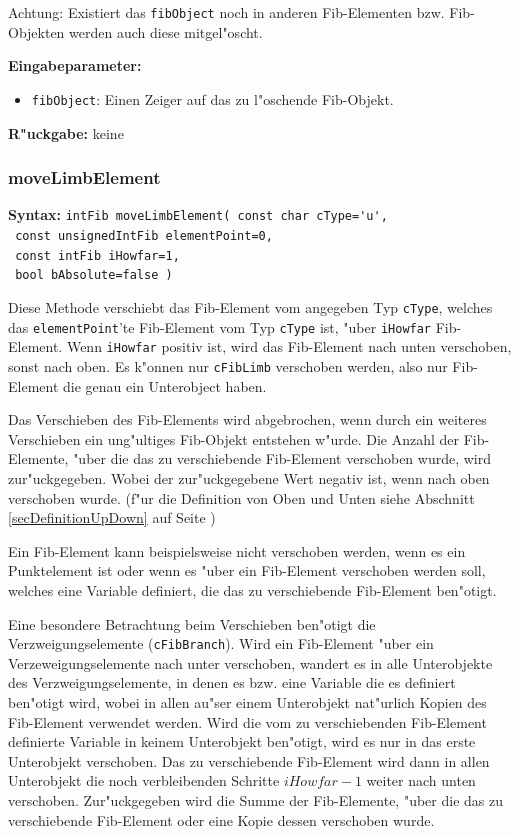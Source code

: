 Achtung: Existiert das \verb|fibObject| noch in anderen Fib-Elementen bzw. Fib-Objekten werden auch diese mitgel"oscht.

\bigskip\noindent
\textbf{Eingabeparameter:}
\begin{itemize}
 \item \verb|fibObject|: Einen Zeiger auf das zu l"oschende Fib-Objekt.
\end{itemize}

\bigskip\noindent
\textbf{R"uckgabe:} keine


\subsubsection{moveLimbElement}
\label{secMoveLimbElement}

\textbf{Syntax:} \verb|intFib moveLimbElement( const char cType='u', | \\\verb| const unsignedIntFib elementPoint=0,| \\\verb| const intFib iHowfar=1,| \\\verb| bool bAbsolute=false ) |

\bigskip\noindent
Diese Methode verschiebt das Fib-Element vom angegeben Typ \verb|cType|, welches das \verb|elementPoint|'te Fib-Element vom Typ \verb|cType| ist, "uber \verb|iHowfar| Fib-Element. Wenn \verb|iHowfar| positiv ist, wird das Fib-Element nach unten verschoben, sonst nach oben. Es k"onnen nur \verb|cFibLimb| verschoben werden, also nur Fib-Element die genau ein Unterobject haben.

Das Verschieben des Fib-Elements wird abgebrochen, wenn durch ein weiteres Verschieben ein ung"ultiges Fib-Objekt entstehen w"urde. Die Anzahl der Fib-Elemente, "uber die das zu verschiebende Fib-Element verschoben wurde, wird zur"uckgegeben. Wobei der zur"uckgegebene Wert negativ ist, wenn nach oben verschoben wurde. (f"ur die Definition von Oben und Unten siehe Abschnitt \ref{secDefinitionUpDown} auf Seite \pageref{secDefinitionUpDown} )

Ein Fib-Element kann beispielsweise nicht verschoben werden, wenn es ein Punktelement ist oder wenn es "uber ein Fib-Element verschoben werden soll, welches eine Variable definiert, die das zu verschiebende Fib-Element ben"otigt.

Eine besondere Betrachtung beim Verschieben ben"otigt die Verzweigungselemente (\verb|cFibBranch|). Wird ein Fib-Element "uber ein Verzeweigungselemente nach unter verschoben, wandert es in alle Unterobjekte des Verzweigungselemente, in denen es bzw. eine Variable die es definiert ben"otigt wird, wobei in allen au"ser einem Unterobjekt nat"urlich Kopien des Fib-Element verwendet werden. Wird die vom zu verschiebenden Fib-Element definierte Variable in keinem Unterobjekt ben"otigt, wird es nur in das erste Unterobjekt verschoben. Das zu verschiebende Fib-Element wird dann in allen Unterobjekt die noch verbleibenden Schritte $iHowfar-1$ weiter nach unten verschoben. Zur"uckgegeben wird die Summe der Fib-Elemente, "uber die das zu verschiebende Fib-Element oder eine Kopie dessen verschoben wurde.

